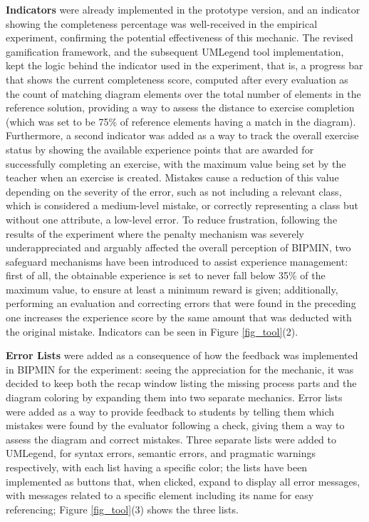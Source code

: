 \textbf{Indicators} were already implemented in the prototype version, and an indicator showing the completeness percentage was well-received in the empirical experiment, confirming the potential effectiveness of this mechanic. The revised gamification framework, and the subsequent UMLegend tool implementation, kept the logic behind the indicator used in the experiment, that is, a progress bar that shows the current completeness score, computed after every evaluation as the count of matching diagram elements over the total number of elements in the reference solution, providing a way to assess the distance to exercise completion (which was set to be 75\% of reference elements having a match in the diagram). Furthermore, a second indicator was added as a way to track the overall exercise status by showing the available experience points that are awarded for successfully completing an exercise, with the maximum value being set by the teacher when an exercise is created. Mistakes cause a reduction of this value depending on the severity of the error, such as not including a relevant class, which is considered a medium-level mistake, or correctly representing a class but without one attribute, a low-level error. To reduce frustration, following the results of the experiment where the penalty mechanism was severely underappreciated and arguably affected the overall perception of BIPMIN, two safeguard mechanisms have been introduced to assist experience management: first of all, the obtainable experience is set to never fall below 35\% of the maximum value, to ensure at least a minimum reward is given; additionally, performing an evaluation and correcting errors that were found in the preceding one increases the experience score by the same amount that was deducted with the original mistake. Indicators can be seen in Figure \ref{fig_tool}(2).

\textbf{Error Lists} were added as a consequence of how the feedback was implemented in BIPMIN for the experiment: seeing the appreciation for the mechanic, it was decided to keep both the recap window listing the missing process parts and the diagram coloring by expanding them into two separate mechanics. Error lists were added as a way to provide feedback to students by telling them which mistakes were found by the evaluator following a check, giving them a way to assess the diagram and correct mistakes. Three separate lists were added to UMLegend, for syntax errors, semantic errors, and pragmatic warnings respectively, with each list having a specific color; the lists have been implemented as buttons that, when clicked, expand to display all error messages, with messages related to a specific element including its name for easy referencing; Figure \ref{fig_tool}(3) shows the three lists.

